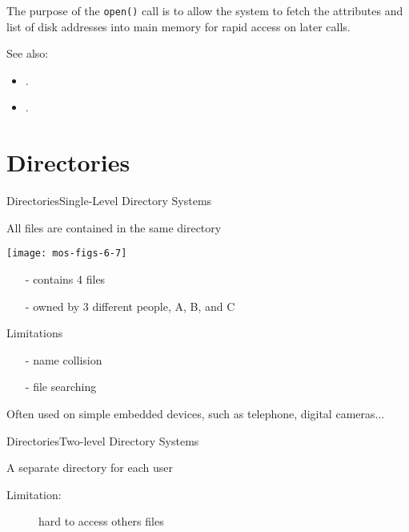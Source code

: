 The purpose of the \verb|open()| call is to allow the system to fetch the attributes and
list of disk addresses into main memory for rapid access on later calls.
  
See also:
\begin{itemize}
\item {}.
\item {}.
\end{itemize}

\section{Directories}

\begin{frame}{Directories}{Single-Level Directory Systems}
  \begin{block}{All files are contained in the same directory}
    \begin{minipage}{.49\textwidth}
      \texttt{[image: mos-figs-6-7]}
    \end{minipage}\hfill
    \begin{minipage}{.49\textwidth}
      \begin{itemize}
      \item[-] contains 4 files
      \item[-] owned by 3 different people, A, B, and C
      \end{itemize}
    \end{minipage}
  \end{block}
  \begin{block}{Limitations}
    \begin{itemize}
    \item[-] name collision
    \item[-] file searching
    \end{itemize}
  \end{block}
  Often used on simple embedded devices, such as telephone, digital cameras...
\end{frame}

\begin{frame}{Directories}{Two-level Directory Systems}
  \begin{iblock}{A separate directory for each user}
    \begin{center}
    \end{center}
    \begin{description}
    \item[Limitation:] hard to access others files
    \end{description}
  \end{iblock}
\end{frame}

